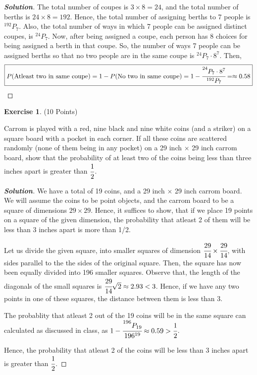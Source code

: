 \documentclass[10pt]{scrartcl}
\theoremstyle{definition}
\newtheorem{exercise}{Exercise}
\newenvironment{solution} {\begin{proof}[\normalfont \textbf{Solution}]} {\end{proof}}
\begin{document}
\begin{solution}
    The total number of coupes is $3 \times 8 = 24$, and the total number of berths is $24 \times 8 = 192$. Hence, the total number of assigning berths to 7 people is 
    $^{192}P_7$. Also, the total number of ways in which 7 people can be assigned distinct coupes, is $^{24}P_7$.
    Now, after being assigned a coupe, each person has 8 choices for being assigned a berth in that coupe. So, the number of ways 7 people
    can be assigned berths so that no two people are in the same coupe is $^{24}P_7 \cdot 8^7$. Then, 
    $$\boxed{P(\text{Atleast two in same coupe}) = 1 - P(\text{No two in same coupe}) = 1 - \cfrac{^{24}P_7\cdot8^7}{^{192}P_7} = \approx 0.58}$$

\end{solution}
\begin{exercise}(10 Points)

    Carrom is played with a red, nine black and nine white coins (and a striker) on a square board
    with a pocket in each corner. If all these coins are scattered randomly (none of them being in
    any pocket) on a 29 inch $\times$ 29 inch carrom board, show that the probability of at least two of
    the coins being less than three inches apart is greater than $\cfrac{1}{2}$.
\end{exercise}
\begin{solution}
    We have a total of 19 coins, and a 29 inch $\times$ 29 inch carrom board. We will assume the coins to be point objects, 
    and the carrom board to be a square of dimensions $29 \times 29$. Hence, it suffices to show, that if we place 
    19 points on a square of the given dimension, the probability that atleast 2 of them will be less than 3 inches apart is 
    more than 1/2. 

    Let us divide the given square, into smaller squares of dimension $\cfrac{29}{14} \times \cfrac{29}{14}$, with sides parallel to the the sides of the original square. 
    Then, the square has now been equally divided into 196 smaller squares. Observe that, the length of the diagonals of the small squares is 
    $\cfrac{29}{14}\sqrt{2} \approx 2.93 < 3$. Hence, if we have any two points in one of these squares, the distance between them is less than 3.

    The probablity that atleast 2 out of the 19 coins will be in the same square can calculated as discussed in class, as 
    $1 - \cfrac{^{196}P_{19}}{196^{19}} \approx 0.59 > \cfrac{1}{2}$.

    Hence, the probability that atleast 2 of the coins will be less than 3 inches apart is greater than $\cfrac{1}{2}$.
\end{solution}
\end{document}
